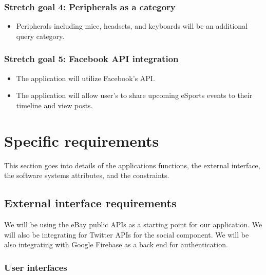 \documentclass[onecolumn, draftclsnofoot,10pt, compsoc]{IEEEtran}
\begin{document}
\subsubsection{Stretch goal 4: Peripherals as a category}
\begin{itemize}
\item Peripherals including mice, headsets, and keyboards will be an additional query category.
\end{itemize}

\subsubsection{Stretch goal 5: Facebook API integration}
\begin{itemize}
\item The application will utilize Facebook's API.
\item The application will allow user's to share upcoming eSports events to their timeline and view posts.
\end{itemize}

\section{Specific requirements}
This section goes into details of the applications functions, the external interface, the software systems attributes, and the constraints.

\subsection{External interface requirements}
We will be using the eBay public APIs as a starting point for our application. We will also be integrating for Twitter APIs for the social component. We will be also integrating with Google Firebase as a back end for authentication. 

\subsubsection{User interfaces}
\end{document}
